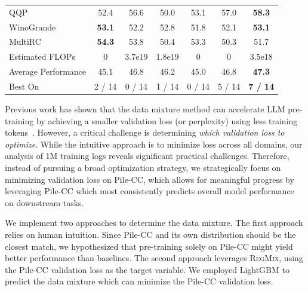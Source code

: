 \documentclass{article}
\theoremstyle{definition}
\theoremstyle{remark}
\newcommand{\ourmethod}{\textsc{RegMix}\xspace}
\begin{document}
\begin{table}[tb]
\begin{tabular}{l|cccccc}
        QQP~\citep{wang2018glue} & 52.4 & 56.6 & 50.0 & 53.1 & 57.0 & \textbf{58.3}  \\ 
        WinoGrande~\citep{sakaguchi2021winogrande} & \textbf{53.1} & 52.2 & 52.8 & 51.8 & 52.1 & \textbf{53.1}  \\ 
        MultiRC~\citep{khashabi2018looking} & \textbf{54.3} & 53.8 & 50.4 & 53.3 & 50.3 & 51.7 \\
        \midrule
        Estimated FLOPs & 0 & $3.7\text{e}19$ & $1.8\text{e}19$ & 0 & 0 & $3.5\text{e}18$ \\
        Average Performance & 45.1 & 46.8 & 46.2 & 45.0 & 46.8 & \textbf{47.3} \\
        Best On & 2 / 14 & 0 / 14 & 1 / 14 & 0 / 14 & 5 / 14 & \textbf{7 / 14} \\
    \bottomrule
    \end{tabular}
\end{table}

Previous work has shown that the data mixture method can accelerate LLM pre-training by achieving a smaller validation loss (or perplexity) using less training tokens~\citep{xie2023doremi}. However, a critical challenge is determining \textit{which validation loss to optimize}.
While the intuitive approach is to minimize loss across all domains, our analysis of 1M training logs reveals significant practical challenges.
Therefore, instead of pursuing a broad optimization strategy, we strategically focus on minimizing validation loss on Pile-CC, which allows for meaningful progress by leveraging Pile-CC which most consistently predicts overall model performance on downstream tasks.

We implement two approaches to determine the data mixture.
The first approach relies on human intuition.
Since Pile-CC and its own distribution should be the closest match, we hypothesized that pre-training solely on Pile-CC might yield better performance than baselines.
The second approach leverages \ourmethod, using the Pile-CC validation loss as the target variable. We employed LightGBM to predict the data mixture which can minimize the Pile-CC validation loss. 
\end{document}
